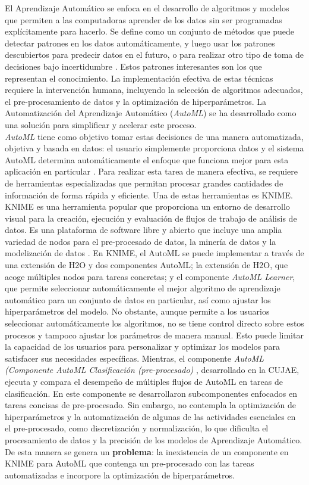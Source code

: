 El Aprendizaje Automático se enfoca en el desarrollo de algoritmos y modelos que permiten a las computadoras aprender de los datos sin ser programadas explícitamente para hacerlo. Se define como un conjunto de métodos que puede detectar patrones en los datos automáticamente, y luego usar los patrones descubiertos para predecir datos en el futuro, o para realizar otro tipo de toma de decisiones bajo incertidumbre \citep{murphy2012machine}. Estos patrones interesantes son los que representan el conocimiento. La implementación efectiva de estas técnicas requiere la intervención humana, incluyendo la selección de algoritmos adecuados, el pre-procesamiento de datos y la optimización de hiperparámetros. La Automatización del Aprendizaje Automático (\textit{AutoML}) se ha desarrollado como una solución para simplificar y acelerar este proceso. \\
 \textit{AutoML} tiene como objetivo tomar estas decisiones de una manera automatizada, objetiva y basada en datos: el usuario simplemente proporciona datos y el sistema AutoML determina automáticamente el enfoque que funciona mejor para esta aplicación en particular \citep{hutter2019automated}. Para realizar esta tarea de manera efectiva, se requiere de herramientas especializadas que permitan procesar grandes cantidades de información de forma rápida y eficiente. Una de estas herramientas es KNIME.\\
KNIME es una herramienta popular que proporciona un entorno de desarrollo visual para la creación, ejecución y evaluación de flujos de trabajo de análisis de datos. Es una plataforma de software libre y abierto que incluye una amplia variedad de nodos para el pre-procesado de datos, la minería de datos y la modelización de datos \citep{knime2023}. En KNIME, el AutoML se puede implementar a través de una extensión de H2O y dos componentes AutoML; la extensión de H2O, que acoge múltiples nodos para tareas concretas; y el componente \textit{AutoML Learner}, que permite seleccionar automáticamente el mejor algoritmo de aprendizaje automático para un conjunto de datos en particular, así como ajustar los hiperparámetros del modelo. No obstante, aunque permite a los usuarios seleccionar automáticamente los algoritmos, no se tiene control directo sobre estos procesos y tampoco ajustar los parámetros de manera manual. Esto puede limitar la capacidad de los usuarios para personalizar y optimizar los modelos para satisfacer sus necesidades específicas. Mientras, el componente \textit{AutoML (Componente AutoML Clasificación (pre-procesado)} \citep{Carrazana2022}, desarrollado en la CUJAE, ejecuta y compara el desempeño de múltiples flujos de AutoML en tareas de clasificación. En este componente se desarrollaron subcomponentes enfocados en tareas concisas de pre-procesado. Sin embargo, no contempla la optimización de hiperparámetros y la automatización de algunas de las actividades esenciales en el pre-procesado, como discretización y normalización, lo que dificulta el procesamiento de datos y la precisión de los modelos de Aprendizaje Automático. De esta manera se genera un \textbf{problema}: la inexistencia de un componente en KNIME para AutoML que contenga un pre-procesado con las tareas automatizadas e incorpore la optimización de hiperparámetros. \\
